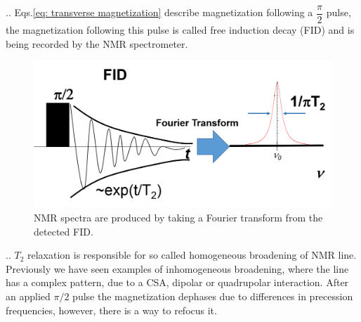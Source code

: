 \documentclass[handout]{beamer}
\begin{document}
\begin{frame}{\thesection.\thesubsection. \insertsubsection}
	Eqs.\ref{eq: transverse magnetization} describe magnetization following a $\dfrac{\pi}{2}$ pulse, the magnetization following this pulse is called \alert{free induction decay (FID)} and is being recorded by the NMR spectrometer.
	
	\begin{figure}
		\centering
		\includegraphics[scale=0.4]{figures/FID.png}
		\caption{NMR spectra are produced by taking a Fourier transform from the detected FID.}
	\end{figure}
	
	
	
 \end{frame}
    
 \begin{frame}{\thesection.\thesubsection. \insertsubsection}
    $T_2$ relaxation is responsible for so called \alert{homogeneous} broadening of NMR line. Previously we have seen examples of \alert{inhomogeneous} broadening, where the line has a complex pattern, due to a CSA, dipolar or quadrupolar interaction. After an applied $\pi/2$ pulse the magnetization dephases due to differences in precession frequencies, however, there is a way to refocus it. 
\end{frame}
\end{document}
